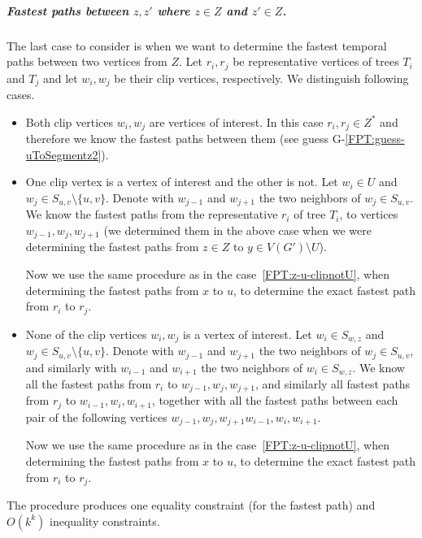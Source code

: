 \documentclass[a4paper,UKenglish,cleveref, autoref, thm-restate, anonymous]{lipics-v2021}
\begin{document}
\subparagraph{\boldmath Fastest paths between $z,z'$ where $z \in Z$ and $z' \in Z$.}
The last case to consider is when we want to determine the fastest temporal paths between two vertices from $Z$.
Let $r_i, r_j$ be representative vertices of trees $T_i$ and $T_j$ and let $w_i, w_j$ be their clip vertices, respectively.
We distinguish following cases.
\begin{itemize}
    \item  Both clip vertices $w_i,w_j$ are vertices of interest.
    In this case $r_i, r_j \in Z^*$
    and therefore we know the fastest paths between them (see guess G-\ref{FPT:guess-uToSegmentz2}).
    \item One clip vertex is a vertex of interest and the other is not.
    Let $w_i \in U$ and $w_j \in S_{u,v} \setminus \{u,v\}$.
    Denote with $w_{j-1}$ and $w_{j+1}$ the two neighbors of $w_j \in S_{u,v}$.
    We know the fastest paths from the representative $r_i$ of tree $T_i$,
    to vertices $w_{j-1},w_j,w_{j+1}$ 
    (we determined them in the above case 
    when we were determining the fastest paths from $z \in Z$ to $y \in V(G')\setminus U$).
    
    Now we use the same procedure as in
    the case~\ref{FPT:z-u-clipnotU}, when determining the fastest paths from $x$ to $u$,
    to determine the exact fastest path from $r_i$ to $r_j$.
    \item None of the clip vertices $w_i, w_j$ is a vertex of interest.
    Let $w_i \in S_{w,z}$ and $w_j \in S_{u,v} \setminus \{u,v\}$.
    Denote with $w_{j-1}$ and $w_{j+1}$ the two neighbors of $w_j \in S_{u,v}$,
    and 
    similarly with 
    $w_{i-1}$ and $w_{i+1}$ the two neighbors of $w_i \in S_{w,z}$.
    We know all the fastest paths from
    $r_i$ to $w_{j-1},w_j,w_{j+1}$,
    and similarly all fastest paths 
    from $r_j$ to $w_{i-1},w_i,w_{i+1}$,
    together with all the fastest paths between 
    each pair of the following vertices
    $w_{j-1},w_j,w_{j+1} w_{i-1},w_i,w_{i+1}$.
    
    Now we use the same procedure as in
    the case~\ref{FPT:z-u-clipnotU}, when determining the fastest paths from $x$ to $u$,
    to determine the exact fastest path from $r_i$ to $r_j$.
\end{itemize}
The procedure produces one equality constraint (for the fastest path) and $O(k^k)$ inequality constraints.
\end{document}
